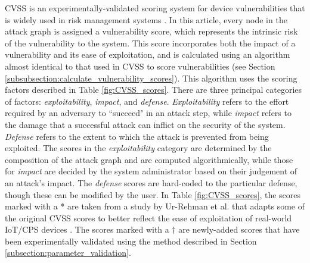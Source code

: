 \documentclass[10pt,journal,compsoc]{IEEEtran}
\begin{document}
CVSS is an experimentally-validated scoring system for device vulnerabilities that is widely
used in risk management systems \cite{first2019specification}. In this article, every node in the attack graph is assigned a vulnerability score, which represents the intrinsic risk of the vulnerability to the system. This score incorporates both the impact of a vulnerability and its ease of exploitation, and is calculated using an algorithm almost identical to that used in CVSS to score vulnerabilities (see Section \ref{subsubsection:calculate_vulnerability_scores}). This algorithm uses the scoring factors described in Table \ref{fig:CVSS_scores}. There are three principal categories of 
factors: \textit{exploitability}, \textit{impact}, and \textit{defense}. \textit{Exploitability} refers to the effort required by an adversary to ``succeed" in an attack step, while \textit{impact} refers to the damage that a successful attack can inflict on the security of the system.
\textit{Defense} refers to the extent to which the attack is prevented from being exploited. The 
scores in the \textit{exploitability} category are determined by the composition of the attack graph 
and are computed algorithmically, while those for \textit{impact} are decided by 
the system administrator based on their judgement of an attack's impact. The \textit{defense} scores are hard-coded to the particular defense, though these can be modified by the user. In Table \ref{fig:CVSS_scores}, the scores marked with a * are taken from a study by Ur-Rehman et al. that adapts some of the original CVSS scores to better reflect the ease of exploitation of real-world IoT/CPS devices \cite{ur-rehman2019}. The scores marked with a $\dagger$ are newly-added scores that have been experimentally validated using the method described in Section \ref{subsection:parameter_validation}.
\end{document}
